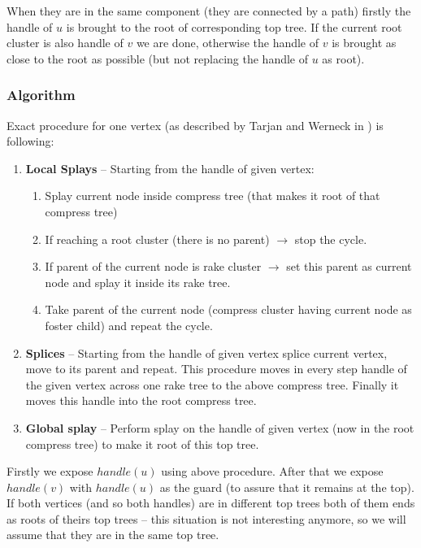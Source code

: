 When they are in the same component (they are connected by a path) firstly the
handle of $u$ is brought to the root of corresponding top tree. If the current
root cluster is also handle of $v$ we are done, otherwise the handle of $v$ is
brought as close to the root as possible (but not replacing the handle of $u$ as
root).

\subsubsection{Algorithm}

Exact procedure for one vertex (as described by Tarjan and Werneck in
\cite{SelfAdjustingTT}) is following:

\begin{enumerate}
\item {\bf Local Splays} -- Starting from the handle of given vertex:
  \begin{enumerate}
  \item Splay current node inside compress tree (that makes it root of that compress tree)
  \item If reaching a root cluster (there is no parent) $\rightarrow$ stop the cycle.
  \item If parent of the current node is rake cluster $\rightarrow$ set this parent
  as current node and splay it inside its rake tree.
  \item Take parent of the current node (compress cluster having current node as
  foster child) and repeat the cycle.
  \end{enumerate}

\item {\bf Splices} -- Starting from the handle of given vertex splice current vertex,
move to its parent and repeat. This procedure moves in every step handle of the given
vertex across one rake tree to the above compress tree. Finally it moves this
handle into the root compress tree.

\item {\bf Global splay} -- Perform splay on the handle of given vertex (now in the
root compress tree) to make it root of this top tree.
\end{enumerate}

Firstly we expose $handle(u)$ using above procedure. After that we expose
$handle(v)$ with $handle(u)$ as the guard (to assure that it remains at the
top). If both vertices (and so both handles) are in different top trees both of
them ends as roots of theirs top trees -- this situation is not interesting
anymore, so we will assume that they are in the same top tree.

